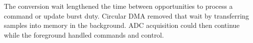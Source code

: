 \label{sec:ctrl-blocking}
The conversion wait lengthened the time between opportunities to process a command or update burst duty. Circular DMA removed that wait by transferring samples into memory in the background. ADC acquisition could then continue while the foreground handled commands and control.
